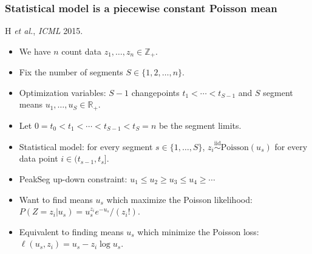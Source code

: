 \documentclass[t]{beamer}
\newcommand{\RR}{\mathbb R}
\newcommand{\ZZ}{\mathbb Z}
\begin{document}
\begin{frame}
  \frametitle{Statistical model is a piecewise constant Poisson mean}
  H {\it et al.}, {\it ICML} 2015. 


  \begin{itemize}
  \item We have $n$ count data $z_1, \dots, z_n\in\ZZ_+$.
  \item Fix the number of segments $S\in\{1, 2, \dots, n\}$.
  \item Optimization variables: $S-1$ changepoints
    $t_1 < \cdots < t_{S-1}$ and $S$ segment means $u_1,\dots,u_S\in\RR_+$.
  \item Let $0=t_0<t_1 < \cdots < t_{S-1}<t_S=n$ be the segment
    limits.
  \item Statistical model: for every segment $s\in\{1,\dots,S\}$,
    $z_i \stackrel{\text{iid}}{\sim} \text{Poisson}(u_s)$ for every data
    point $i\in(t_{s-1},t_s]$.
  \item PeakSeg up-down constraint: $u_1\leq u_2 \geq u_3 \leq u_4 \geq \cdots$
  \item Want to find means $u_s$ which maximize the Poisson likelihood:
    $P(Z = z_i|u_s) = u_s^{z_i} e^{-u_s} / (z_i!)$.
  \item Equivalent to finding means $u_s$ which minimize the Poisson
    loss: $\ell(u_s, z_i) = u_s - z_i\log u_s$.
  \end{itemize}
\end{frame}
\end{document}
